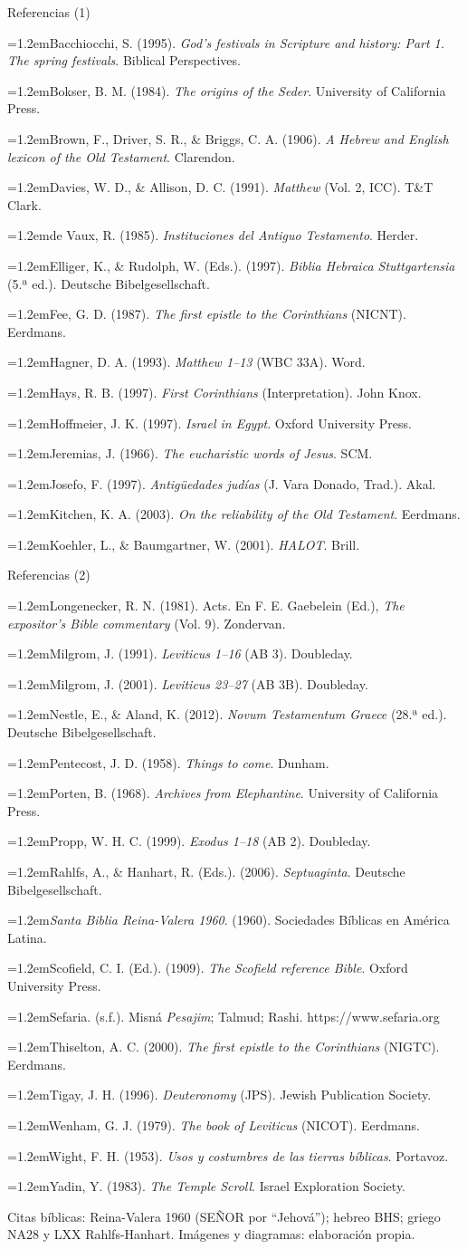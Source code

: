 \documentclass[hyperref={bookmarks=false},aspectratio=169]{beamer}
\newcommand{\SENOR}{S{\fontsize{0.78em}{1em}\selectfont EÑOR}}
\newcommand{\refapa}[1]{\par{\RaggedRight\hangindent=1.2em\hangafter=1\noindent #1\par}\vspace{3pt}}
\begin{document}
\begin{frame}{Referencias (1)}
\fontsize{6}{7.2}\selectfont
\refapa{Bacchiocchi, S. (1995). \emph{God's festivals in Scripture and history: Part 1. The spring festivals}. Biblical Perspectives.}
\refapa{Bokser, B. M. (1984). \emph{The origins of the Seder}. University of California Press.}
\refapa{Brown, F., Driver, S. R., \& Briggs, C. A. (1906). \emph{A Hebrew and English lexicon of the Old Testament}. Clarendon.}
\refapa{Davies, W. D., \& Allison, D. C. (1991). \emph{Matthew} (Vol. 2, ICC). T\&T Clark.}
\refapa{de Vaux, R. (1985). \emph{Instituciones del Antiguo Testamento}. Herder.}
\refapa{Elliger, K., \& Rudolph, W. (Eds.). (1997). \emph{Biblia Hebraica Stuttgartensia} (5.ª ed.). Deutsche Bibelgesellschaft.}
\refapa{Fee, G. D. (1987). \emph{The first epistle to the Corinthians} (NICNT). Eerdmans.}
\refapa{Hagner, D. A. (1993). \emph{Matthew 1--13} (WBC 33A). Word.}
\refapa{Hays, R. B. (1997). \emph{First Corinthians} (Interpretation). John Knox.}
\refapa{Hoffmeier, J. K. (1997). \emph{Israel in Egypt}. Oxford University Press.}
\refapa{Jeremias, J. (1966). \emph{The eucharistic words of Jesus}. SCM.}
\refapa{Josefo, F. (1997). \emph{Antigüedades judías} (J. Vara Donado, Trad.). Akal.}
\refapa{Kitchen, K. A. (2003). \emph{On the reliability of the Old Testament}. Eerdmans.}
\refapa{Koehler, L., \& Baumgartner, W. (2001). \emph{HALOT}. Brill.}
\end{frame}

\begin{frame}{Referencias (2)}
\fontsize{6}{7.2}\selectfont
\refapa{Longenecker, R. N. (1981). Acts. En F. E. Gaebelein (Ed.), \emph{The expositor's Bible commentary} (Vol. 9). Zondervan.}
\refapa{Milgrom, J. (1991). \emph{Leviticus 1--16} (AB 3). Doubleday.}
\refapa{Milgrom, J. (2001). \emph{Leviticus 23--27} (AB 3B). Doubleday.}
\refapa{Nestle, E., \& Aland, K. (2012). \emph{Novum Testamentum Graece} (28.ª ed.). Deutsche Bibelgesellschaft.}
\refapa{Pentecost, J. D. (1958). \emph{Things to come}. Dunham.}
\refapa{Porten, B. (1968). \emph{Archives from Elephantine}. University of California Press.}
\refapa{Propp, W. H. C. (1999). \emph{Exodus 1--18} (AB 2). Doubleday.}
\refapa{Rahlfs, A., \& Hanhart, R. (Eds.). (2006). \emph{Septuaginta}. Deutsche Bibelgesellschaft.}
\refapa{\emph{Santa Biblia Reina-Valera 1960}. (1960). Sociedades Bíblicas en América Latina.}
\refapa{Scofield, C. I. (Ed.). (1909). \emph{The Scofield reference Bible}. Oxford University Press.}
\refapa{Sefaria. (s.f.). Misná \emph{Pesajim}; Talmud; Rashi. https://www.sefaria.org}
\refapa{Thiselton, A. C. (2000). \emph{The first epistle to the Corinthians} (NIGTC). Eerdmans.}
\refapa{Tigay, J. H. (1996). \emph{Deuteronomy} (JPS). Jewish Publication Society.}
\refapa{Wenham, G. J. (1979). \emph{The book of Leviticus} (NICOT). Eerdmans.}
\refapa{Wight, F. H. (1953). \emph{Usos y costumbres de las tierras bíblicas}. Portavoz.}
\refapa{Yadin, Y. (1983). \emph{The Temple Scroll}. Israel Exploration Society.}\par\smallskip
{\color{sepia}Citas bíblicas: Reina-Valera 1960 (\SENOR{} por ``Jehová''); hebreo BHS; griego NA28 y LXX Rahlfs-Hanhart. Imágenes y diagramas: elaboración propia.}
\end{frame}
\end{document}
